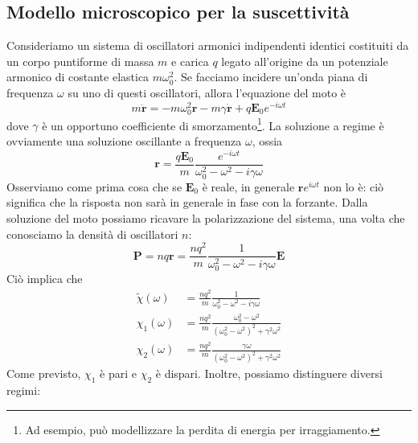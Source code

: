 \documentclass[a4paper,11pt]{book}
\renewcommand{\vec}[1]{\mathbf{#1}}
\theoremstyle{theorem}
\theoremstyle{definition}
\begin{document}
\subsection{Modello microscopico per la suscettività}
Consideriamo un sistema di oscillatori armonici indipendenti identici costituiti da un corpo puntiforme di massa $m$ e carica $q$ legato all'origine da un potenziale armonico di costante elastica $m\omega_0^2$. Se facciamo incidere un'onda piana di frequenza $\omega$ su uno di questi oscillatori, allora l'equazione del moto è
\[m\ddot{\vec{r}}=-m\omega_0^2\vec{r}-m\gamma\dot{\vec{r}}+q\vec{E}_0e^{-i\omega t}\]
dove $\gamma$ è un opportuno coefficiente di smorzamento\footnote{Ad esempio, può modellizzare la perdita di energia per irraggiamento.}. La soluzione a regime è ovviamente una soluzione oscillante a frequenza $\omega$, ossia
\[\vec{r}=\frac{q\vec{E}_0}{m}\frac{e^{-i\omega t}}{\omega_0^2-\omega^2-i\gamma\omega}\]
Osserviamo come prima cosa che se $\vec{E}_0$ è reale, in generale $\vec{r}e^{i\omega t}$ non lo è: ciò significa che la risposta non sarà in generale in fase con la forzante. Dalla soluzione del moto possiamo ricavare la polarizzazione del sistema, una volta che conosciamo la densità di oscillatori $n$:
\[\vec{P}=nq\vec{r}=\frac{nq^2}{m}\frac{1}{\omega_0^2-\omega^2-i\gamma\omega}\vec{E}\]
Ciò implica che
\begin{align*}\tilde{\chi}(\omega)&=\frac{nq^2}{m}\frac{1}{\omega_0^2-\omega^2-i\gamma\omega}\\\chi_1(\omega)&=\frac{nq^2}{m}\frac{\omega_0^2-\omega^2}{(\omega_0^2-\omega^2)^2+\gamma^2\omega^2}\\\chi_2(\omega)&=\frac{nq^2}{m}\frac{\gamma\omega}{(\omega_0^2-\omega^2)^2+\gamma^2\omega^2}\end{align*}
Come previsto, $\chi_1$ è pari e $\chi_2$ è dispari. Inoltre, possiamo distinguere diversi regimi:
\end{document}
